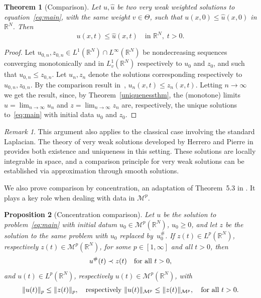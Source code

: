 \documentclass[leqno,12pt]{amsart}
\newtheorem{theorem}{Theorem}[section]
\newtheorem{proposition}[theorem]{Proposition}
\theoremstyle{definition}
\theoremstyle{remark}
\newtheorem{remark}{Remark}
\numberwithin{equation}{section}
\begin{document}
\begin{theorem}[Comparison]\label{thm:comparison}
    Let $u,\hat{u}$ be two very weak weighted solutions to equation~\eqref{eq:main}, with the same weight $v\in\Theta$, such that $u(x,0)\leq \hat{u}(x,0)$ in $\mathbb{R}^N$. Then
    $$
        u(x,t)\leq \hat{u}(x,t)\quad \text{in }\mathbb{R}^N,\;t>0.
    $$
\end{theorem}

\begin{proof}
 Let $u_{0,n}, z_{0,n} \in L^1(\mathbb{R}^N)\cap L^{\infty}(\mathbb{R}^N)$ be nondecreasing sequences converging monotonically and in $L^1_v(\mathbb{R}^N)$ respectively to $u_0$ and $z_0$, and such that $u_{0,n}\le z_{0,n}$. Let $u_n,z_n$ denote the solutions corresponding respectively to $u_{0,n},z_{0,n}$. By the comparison result in~\cite[Theorem 2.4]{b1}, $u_n(x,t)\leq z_n(x,t)$. Letting $n\to\infty$ we get the result, since, by Theorem~\ref{uniquenessthm}, the (monotone) limits $u=\lim_{n\to\infty}u_n$ and $z=\lim_{n\to\infty}z_n$ are, respectively, the unique solutions to~\eqref{eq:main} with initial data $u_0$ and $z_0$.
\end{proof}

\begin{remark}
    This argument also applies to the classical case involving the standard Laplacian. The theory of very weak solutions developed by Herrero and Pierre in \cite{herreropierre} provides both existence and uniqueness in this setting. These solutions are locally integrable in space, and a comparison principle for very weak solutions can be established via approximation through smooth solutions.
\end{remark}

 We also prove comparison by concentration, an adaptation of Theorem~5.3 in \cite{volzone}. It plays a key role when dealing with data in $\mathcal{M}^p$.

\begin{proposition}[Concentration comparison]\label{propo:concentrationcomparison}
Let $u$ be the solution to problem~\eqref{eq:main} with initial datum $u_0\in \mathcal{M}^p(\mathbb{R}^N)$, $u_0\ge 0$, and let $z$ be the solution to the same problem with $u_0$ replaced by~$u_0^{\#}$. If $z(t)\in L^p(\mathbb{R}^N)$, respectively $z(t)\in \mathcal{M}^p(\mathbb{R}^N)$, for some $p\in[1,\infty]$ and all $t>0$, then
\begin{equation}\label{eq:concentration.ordering}
    u^{\#}(t)\prec z(t)\quad\textup{for all }t>0,
\end{equation}
and $u(t)\in L^p(\mathbb{R}^N)$, respectively $u(t)\in \mathcal{M}^p(\mathbb{R}^N)$, with
\[
    \|u(t)\|_p\le \|z(t)\|_p,\quad \textup{respectively } \|u(t)\|_{\mathcal{M}^p} \le \|z(t)\|_{\mathcal{M}^p},\quad \text{for all }t>0.
\]

\end{proposition}
\end{document}
